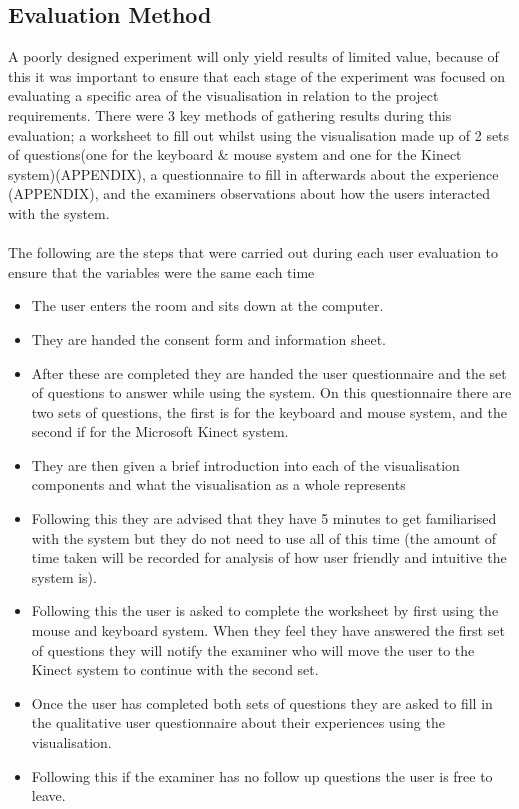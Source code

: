 \subsection{Evaluation Method}
A poorly designed experiment will only yield results of limited value, because
of this it was important to ensure that each stage of the experiment was
focused on evaluating a specific area of the visualisation in relation to the
project requirements. There were 3 key methods of gathering results during this
evaluation; a
worksheet to fill out whilst using the visualisation made up of 2 sets of
questions(one for the keyboard \& mouse system and one for the Kinect
system)(APPENDIX), a questionnaire to
fill in afterwards about the experience (APPENDIX), and the examiners
observations about
how the users interacted with the system.  
\\\\
The following are the steps that were carried out during each user evaluation to
ensure that the variables were the same each time
\begin{itemize}
\item The user enters the room and sits down at the computer.
\item They are handed the consent form and information sheet.
\item After these are completed they are handed the user questionnaire and the
set of questions to answer while using the system. On this questionnaire there
are two sets of questions, the first is for the keyboard and mouse system, and
the second if for the Microsoft Kinect system.
\item They are then given a brief introduction into each of the visualisation
components and what the visualisation as a whole represents
\item Following this they are advised that they have 5 minutes to get
familiarised with the system but they do not need to use all of this time (the
amount of time taken will be recorded for analysis of how user friendly and
intuitive the system is).
\item Following this the user is asked to complete the worksheet by first
using the mouse and keyboard system. When they feel they have answered the first
set of questions they will notify the examiner who will move the user to the
Kinect
system to continue with the second set.
\item Once the user has completed both sets of questions they are asked to fill
in the qualitative user questionnaire about their experiences using the
visualisation. 
\item Following this if the examiner has no follow up questions the user is free
to leave.
\end{itemize}

